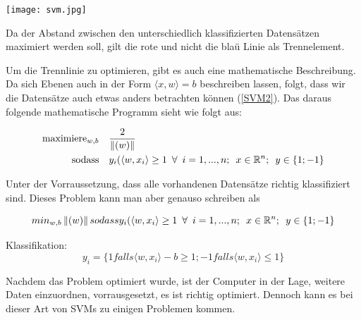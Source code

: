 \begin{dsafigure}
\begin{center}
	\texttt{[image: svm.jpg]}
	\caption{Da der Abstand zwischen den unterschiedlich klassifizierten Datensätzen maximiert werden soll, gilt die rote und nicht die blaü Linie als Trennelement.}
	\label{SVM1}
	\end{center}
\end{dsafigure}


Um die Trennlinie zu optimieren, gibt es auch eine mathematische Beschreibung. Da sich Ebenen auch in der Form $\langle x, w \rangle = b $ beschreiben lassen, folgt, dass wir die Datensätze auch etwas anders betrachten können (\ref{SVM2}). %
Das daraus folgende mathematische Programm sieht wie folgt aus: 

\begin{align*}
	\operatorname{maximiere}_{w,b} &\quad\frac{2}{\norm{(w)}} \\
	\operatorname{sodass} &\quad y_{i}(\langle w,x_{i} \rangle \geq 1 \hspace{5pt} \forall \hspace{5pt} i = 1,...,n ;  \hspace{5pt} x \in \mathbb{R}^n; \hspace{5pt} 	y \in \{1; -1\}
	 \label{SVM-ProblemMax}
\end{align*}

Unter der Vorraussetzung, dass alle vorhandenen Datensätze richtig klassifiziert sind. Dieses Problem kann 
man aber genauso schreiben als 

\begin{equation*}
		min_{w,b} \norm{(w)} \\
		sodass y_{i}(\langle w,x_{i} \rangle \geq 1 \hspace{5pt} \forall \hspace{5pt} i = 1,...,n ;\hspace{5pt} x \in \mathbb{R}^n; \hspace{5pt} 	y \in \{1; -1\}
		\label{SVM-ProblemMin}
\end{equation*}

Klassifikation:
\begin{equation*}
y_{i} = \{1 falls \langle w,x_{i} \rangle - b \geq 1; -1 falls \langle w,x_{i} \rangle \leq 1\}
	\label{KlassifikationSVM}
\end{equation*}

Nachdem das Problem optimiert wurde, ist der Computer in der Lage, weitere Daten einzuordnen, vorrausgesetzt, es ist richtig optimiert.
Dennoch kann es bei dieser Art von SVMs zu einigen Problemen kommen.

